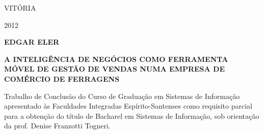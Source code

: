 \documentclass[a4paper]{article}
\begin{document}
\bigskip


\bigskip


\bigskip


\bigskip


\bigskip


\bigskip


\bigskip


\bigskip


\bigskip

{\centering{}\sffamily
VIT\'ORIA
\par}

{\centering{}
\textsf{2012}
\par}

{\centering{}\sffamily\bfseries
EDGAR ELER
\par}


\bigskip


\bigskip


\bigskip


\bigskip


\bigskip


\bigskip


\bigskip


\bigskip


\bigskip


\bigskip


\bigskip


\bigskip


\bigskip


\bigskip


\bigskip


\bigskip


\bigskip

{\centering{}
\textsf{\textbf{A INTELIG\^ENCIA DE NEG\'OCIOS COMO FERRAMENTA M\'OVEL DE GEST\~AO DE VENDAS NUMA EMPRESA DE COM\'ERCIO
DE FERRAGENS}}
\par}


\bigskip


\bigskip


\bigskip


\bigskip


\bigskip


\bigskip


\bigskip


\bigskip


\bigskip


\bigskip

{
\textsf{Trabalho de Conclus\~ao do Curso de Gradua\c{c}\~ao em Sistemas de Informa\c{c}\~ao apresentado \`as Faculdades
Integradas Esp\'irito-Santenses como requisito parcial para a obten\c{c}\~ao do t\'itulo de Bacharel em Sistemas de
Informa\c{c}\~ao, sob orienta\c{c}\~ao da prof{\textordfeminine}. Denise Franzotti Togneri.}}
\end{document}
